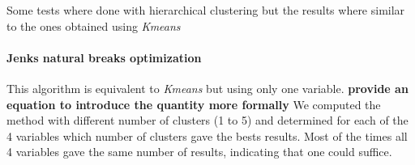 Some tests where done with hierarchical clustering but the results where similar to the ones obtained using \emph{Kmeans}

\paragraph{Jenks natural breaks optimization}

This algorithm is equivalent to \emph{Kmeans} but using only one variable.
{\bf provide an equation to introduce the quantity more formally}
We computed the method with different number of clusters (1 to 5) and determined for each of the 4 variables which number of clusters gave the bests results. Most of the times all 4 variables gave the same number of results, indicating that one could suffice.
